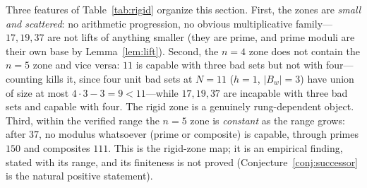 \documentclass[11pt,a4paper]{article}
\numberwithin{equation}{section}
\theoremstyle{plain}
\theoremstyle{definition}
\theoremstyle{remark}
\begin{document}
\begin{center}
\end{center}

Three features of Table~\ref{tab:rigid} organize this section. First, the
zones are \emph{small and scattered}: no arithmetic progression, no
obvious multiplicative family---$17,19,37$ are not lifts of anything
smaller (they are prime, and prime moduli are their own base by
Lemma~\ref{lem:lift}). Second, the $n=4$ zone does not contain the $n=5$
zone and vice versa: $11$ is capable with three bad sets but not with
four---counting kills it, since four unit bad sets at $N=11$ ($h=1$,
$|B_w|=3$) have union of size at most $4\cdot 3-3=9<11$---while
$17,19,37$ are incapable with three bad sets and capable with four. The
rigid zone is a genuinely rung-dependent object. Third, within the
verified range the $n=5$ zone is \emph{constant} as the range grows:
after $37$, no modulus whatsoever (prime or composite) is capable, through
primes $150$ and composites $111$. This is the rigid-zone map; it is
an empirical finding, stated with its range, and its
finiteness is not proved (Conjecture~\ref{conj:successor} is the natural
positive statement).
\end{document}
